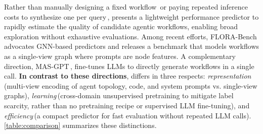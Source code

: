 \begin{table}
\vspace*{-0.75cm}
\caption{Comparison between ours{} and existing frameworks for prediction-based workflow generation.} \label{table:comparison}
\vspace*{-0.3cm}
\end{table}


Rather than manually designing a fixed workflow\,\citep{ChatDev_ACL_24, AgentVerse_ICLR_24, LLMDebate_ICML_24} or paying repeated inference costs to synthesize one per query\,\citep{GPTSwarm_ICML24, DyLAN_COLM_24}, \ours{} presents a lightweight performance predictor to rapidly estimate the quality of candidate agentic workflows, enabling broad exploration without exhaustive evaluations. Among recent efforts, FLORA-Bench\,\citep{FLORA_Bench_25} advocates GNN-based predictors and releases a benchmark that models workflows as a single-view graph where prompts are node features. A complementary direction, MAS-GPT\,\citep{MASGPT_25}, fine-tunes LLMs to directly generate workflows in a single call. \textbf{In contrast to these directions}, \ours{} differs in three respects: \emph{representation}\,(multi-view encoding of agent topology, code, and system prompts vs. single-view graphs), \emph{learning}\,(cross-domain unsupervised pretraining to mitigate label scarcity, rather than no pretraining recipe or supervised LLM fine-tuning), and \emph{efficiency}\,(a compact predictor for fast evaluation without repeated LLM calls). \autoref{table:comparison} summarizes these distinctions.


